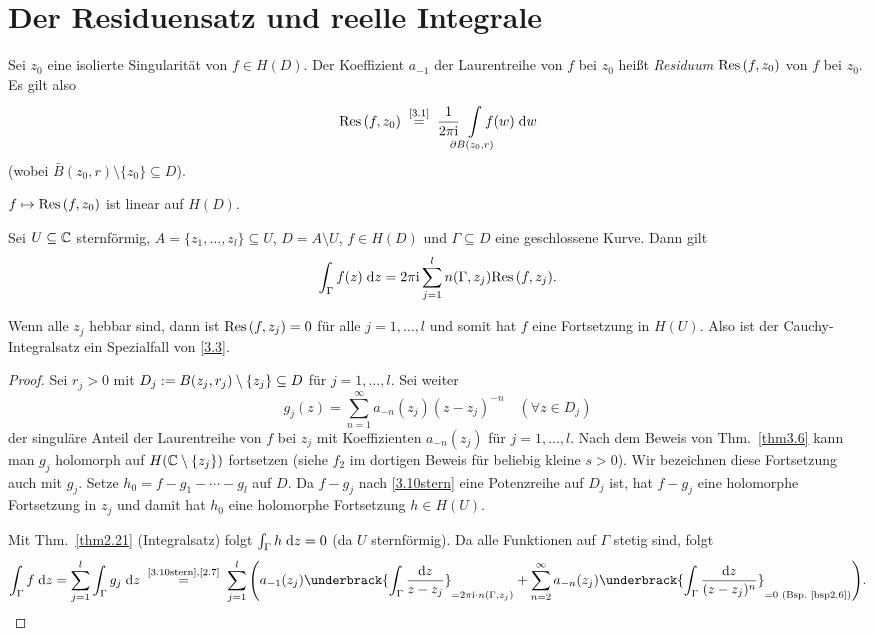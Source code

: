\documentclass[a4paper,twoside,DIV15,BCOR12mm]{scrbook}
\begin{document}
\section{Der Residuensatz und reelle Integrale}

\begin{dfn} \label{dfn2.9}
  Sei $z_0$ eine isolierte Singularität von $f\in H(D)$. Der Koeffizient $a_{-1}$ der Laurentreihe von $f$ bei $z_0$ heißt
  \emph{Residuum} $\mathrm{Res}\left(f,z_0\right)$ von $f$ bei $z_0$. Es gilt also
  \[ \Res{f}{z_0} \nach{=}{\eqref{3.1}} \frac{1}{2\pi\i} \!\!\!\!\Integral{\partial B(z_0,r)}{}{\!\!\!\!\!\!f(w)}{w} \]
  (wobei $\bar{B}(z_0,r)\setminus\{z_0\} \subseteq D$).
\end{dfn}
\begin{bem*}
  $f\mapsto\mathrm{Res}\left(f,z_0\right)$ ist linear auf $H(D)$.
\end{bem*}

\begin{thm}[Residuensatz] \label{thm3.10}
  Sei $U\subseteq\mathbb{C}$ sternförmig, $A=\{z_1,\dotsc,z_l\}\subseteq U$, $D=A\setminus U$, $f\in H(D)$ und $\Gamma\subseteq D$ eine
  geschlossene Kurve. Dann gilt
  \begin{equation} \label{3.3}
    \int_{\Gamma}^{}{f(z)}\;\mathrm{d} z = 2\pi\mathrm{i} \sum_{j=1}^l{n(\Gamma,z_j)\mathrm{Res}\left(f,z_j\right)}.
  \end{equation}
\end{thm}
\begin{bem*}
  Wenn alle $z_j$ hebbar sind, dann ist $\mathrm{Res}\left(f,z_j\right)=0$ für alle $j=1,\dotsc,l$ und somit hat $f$ eine Fortsetzung in
  $H(U)$. Also ist der Cauchy-Integralsatz ein Spezialfall von \eqref{3.3}.
\end{bem*}
\begin{proof}
  Sei $r_j>0$ mit $D_j:= B(z_j,r_j)\setminus\{z_j\} \subseteq D$ für $j=1,\dotsc,l$. Sei weiter
  \begin{equation*} \label{3.10stern}
    g_j(z) = \sum_{n=1}^\infty {a_{-n}(z_j)(z-z_j)^{-n}} \quad (\forall z\in D_j) \tag{$*$}
  \end{equation*}
  der singuläre Anteil der Laurentreihe von $f$ bei $z_j$ mit Koeffizienten $a_{-n}(z_j)$ für $j=1,\dotsc,l$. Nach dem Beweis
  von Thm.~\ref{thm3.6} kann man $g_j$ holomorph auf $H(\mathbb{C}\setminus\{z_j\})$ fortsetzen (siehe $f_2$ im dortigen Beweis für
  beliebig kleine $s>0$). Wir bezeichnen diese Fortsetzung auch mit $g_j$. Setze $h_0=f-g_1-\dotsb-g_l$ auf $D$. Da $f-g_j$ nach
  \eqref{3.10stern} eine Potenzreihe auf $D_j$ ist, hat $f-g_j$ eine holomorphe Fortsetzung in $z_j$ und damit hat $h_0$ eine
  holomorphe Fortsetzung $h\in H(U)$.

  Mit Thm.~\ref{thm2.21} (Integralsatz) folgt $\int_{\Gamma}^{}{h}\;\mathrm{d} z=0$ (da $U$ sternförmig). Da alle Funktionen auf
  $\Gamma$ stetig sind, folgt
  \[ \integral{\Gamma}{}{f}{z} = \sum_{j=1}^l{\integral{\Gamma}{}{g_j}{z}} \nach{=}{\eqref{3.10stern},\eqref{2.7}}
  \sum_{j=1}^l{\Biggl(a_{-1}(z_j) \underbrack{\int_\Gamma{\frac{\d z}{z-z_j}}}_{=2\pi\i\cdot n(\Gamma,z_j)} +
      \sum_{n=2}^\infty{a_{-n}(z_j) \underbrack{\int_\Gamma{\frac{\d z}{(z-z_j)^n}}}_{=0\text{ (Bsp.~\ref{bsp2.6})}}} \Biggr)}. \qedhere \]
\end{proof}
\end{document}
